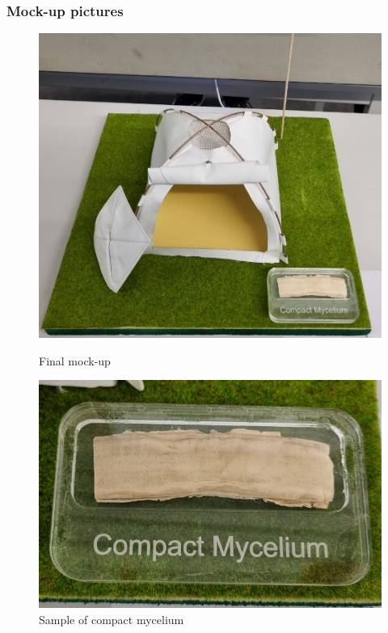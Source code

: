 \documentclass{article}
\begin{document}
\subsubsection{Mock-up pictures}
\begin{figure}[ht!]
    \centering
    \begin{minipage}{0.475\textwidth}
        \centering
        \includegraphics[width=.8\textwidth]{media/final_mockup.png}
        \caption{Final mock-up}
        \label{fig:final_mockup}
    \end{minipage}%
    \hfill
    \begin{minipage}{0.45\textwidth}
        \centering
        \includegraphics[width=\textwidth]{media/compact_myc.png}
        \caption{Sample of compact mycelium}
        \label{fig:compact_myc}
    \end{minipage}
\end{figure}
\end{document}
